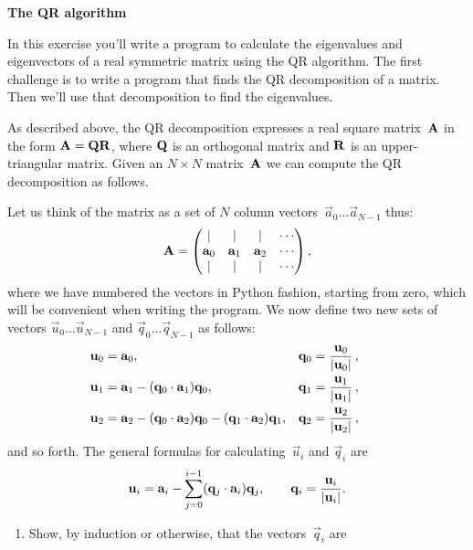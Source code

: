 \documentclass[12pt]{article}
\begin{document}
\begin{exercises}

\exercise \textbf{The QR algorithm}

\exskip In this exercise you'll write a
program to calculate the eigenvalues and eigenvectors of a real symmetric
matrix using the QR algorithm.  The first challenge is to write a program
that finds the QR decomposition of a matrix.  Then we'll use that
decomposition to find the eigenvalues.

As described above, the QR decomposition expresses a real square
matrix~$\mat{A}$ in the form $\mat{A}=\mat{Q}\mat{R}$, where $\mat{Q}$ is
an orthogonal matrix and $\mat{R}$ is an upper-triangular matrix.  Given an
$N\times N$ matrix~$\mat{A}$ we can compute the QR decomposition as
follows.

Let us think of the matrix as a set of $N$ column
vectors~$\vec{a}_0\ldots\vec{a}_{N-1}$ thus:
\begin{displaymath}
\mat{A} = \begin{pmatrix}
            | & | & | & \cdots \\
            \vec{a}_0 & \vec{a}_1 & \vec{a}_2 & \cdots \\
            | & | & | & \cdots
          \end{pmatrix},
\end{displaymath}
where we have numbered the vectors in Python fashion, starting from zero,
which will be convenient when writing the program.  We now define two new
sets of vectors $\vec{u}_0\ldots\vec{u}_{N-1}$ and
$\vec{q}_0\ldots\vec{q}_{N-1}$ as follows:
\begin{align*}
\vec{u}_0 &= \vec{a}_0,
  & \vec{q}_0 = {\vec{u}_0\over|\vec{u}_0|}\,,\qquad \\
\vec{u}_1 &= \vec{a}_1 - (\vec{q}_0\cdot\vec{a}_1) \vec{q}_0,
  & \vec{q}_1 = {\vec{u}_1\over|\vec{u}_1|}\,, \qquad \\
\vec{u}_2 &= \vec{a}_2 - (\vec{q}_0\cdot\vec{a}_2) \vec{q}_0
             - (\vec{q}_1\cdot\vec{a}_2) \vec{q}_1,
  & \vec{q}_2 = {\vec{u}_2\over|\vec{u}_2|}\,, \qquad
\end{align*}
and so forth.  The general formulas for calculating~$\vec{u}_i$ and
$\vec{q}_i$ are
\begin{displaymath}
\vec{u}_i = \vec{a}_i - \sum_{j=0}^{i-1} (\vec{q}_j\cdot\vec{a}_i)
            \vec{q}_j, \qquad
\vec{q}_i = {\vec{u}_i\over|\vec{u}_i|}.
\end{displaymath}
\begin{enumerate}\setlength{\itemsep}{0pt}
\item Show, by induction or otherwise, that the vectors~$\vec{q}_i$ are

\end{enumerate}
\end{exercises}
\end{document}
